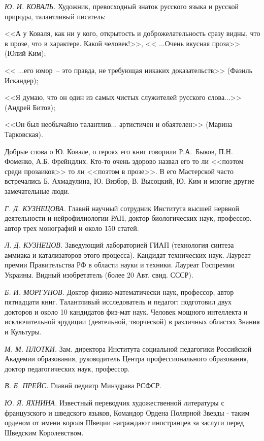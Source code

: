 \textit{Ю. И. КОВАЛЬ.} Художник, превосходный знаток русского языка и русской природы, талантливый писатель:

<<А у Коваля, как ни у кого, открытость и доброжелательность сразу видны, что в прозе, что в характере. Какой человек!>>, << ...Очень вкусная проза>> (Юлий Ким);

<< ...его юмор~-- это правда, не требующая никаких доказательств>> (Фазиль Искандер);

<<Я думаю, что он один из самых чистых служителей русского слова...>> (Андрей Битов);

<<Он был необычайно талантлив... артистичен и обаятелен>> (Марина Тарковская).

Добрые слова о Ю. Ковале, о героях его книг говорили Р.А.~Быков, П.Н. Фоменко, А.Б. Фрейндлих. Кто-то очень здорово назвал его то ли <<поэтом среди прозаиков>> то ли <<поэтом в прозе>>. В его Мастерской часто встречались Б. Ахмадулина, Ю. Визбор, В. Высоцкий, Ю. Ким  и многие другие замечательные люди.

\textit{Г. Д. КУЗНЕЦОВА.} Главнй научный сотрудник Института высшей нервной деятельности и нейрофилиологии РАН, доктор биологических наук, профессор. автор трех монографий и около 150 статей.

\textit{Л. Д. КУЗНЕЦОВ.} Заведующий лабораторией ГИАП (технология синтеза аммиака и катализаторов этого процесса). Кандидат технических наук. Лауреат премии Правительства РФ в области науки и техники. Лауреат Госпремии Украины. Видный изобретатель (более 20 Авт. свид. СССР).

\textit{Б. И. МОРГУНОВ.} Доктор физико-математически наук, профессор, автор пятнадцати книг. Талантливый исследователь и педагог: подготовил двух докторов и около 10 кандидатов физ-мат наук. Человек мощного интеллекта и исключительной эрудиции (деятельной, творческой) в различных областях Знания и Культуры.

\textit{М. М. ПЛОТКИ.} Зам. директора Института социальной педагогики Российской Академии образования, руководитель Центра профессионального образования, доктор педагогических наук, профессор.

\textit{В. Б. ПРЕЙС.} Главнй педиатр Минздрава РСФСР.

\textit{Ю. Я. ЯХНИНА.} Известный переводчик художественной литературы с французского и шведского языков,  Командор Ордена Полярной Звезды - таким орденом от имени короля Швеции награждают иностранцев за  заслуги перед Шведским Королевством.
